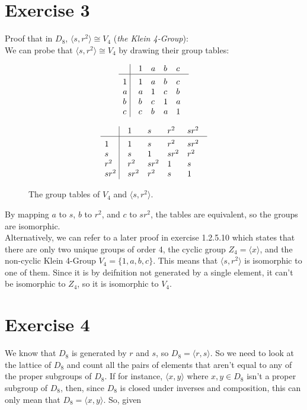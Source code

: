 \documentclass[12pt]{article}
\begin{document}
    \section*{Exercise 3}
    Proof that in $D_8$, $\langle s, r^2 \rangle \cong V_4$
    (\textit{the Klein 4-Group}): \\
    We can probe that $\langle s, r^2 \rangle \cong V_4$
    by drawing their group tables:

    \begin{figure}[H]
        \centering

        \[\vbox{\tabskip0.5em\offinterlineskip
        \halign{\strut$#$\hfil\ \tabskip1em\vrule&&$#$\hfil\cr
        ~   & 1   & a   & b & c \cr
        \noalign{\hrule}\vrule height 12pt width 0pt
        1   & 1 & a & b & c \cr 
        a   & a & 1 & c & b \cr 
        b   & b & c & 1 & a \cr 
        c   & c & b & a & 1 \cr
        }}\]

        
        \[\vbox{\tabskip0.5em\offinterlineskip
        \halign{\strut$#$\hfil\ \tabskip1em\vrule&&$#$\hfil\cr
        ~   & 1   & s   & r^2 & sr^2 \cr
        \noalign{\hrule}\vrule height 12pt width 0pt
        1   & 1 & s & r^2 & sr^2 \cr 
        s   & s & 1 & sr^2 & r^2 \cr 
        r^2   & r^2 & sr^2 & 1 & s \cr 
        sr^2   & sr^2 & r^2 & s & 1 \cr
        }}\]

        \caption{\label{fig:figure1} The group tables of $V_4$
        and $\langle s, r^2 \rangle$.}
    \end{figure}

    By mapping $a$ to $s$, $b$ to $r^2$, and $c$ to $sr^2$,
    the tables are equivalent,
    so the groups are isomorphic. \\ 
    Alternatively, we can refer to a later proof in exercise 1.2.5.10
    which states that there are only two unique groups of order 4,
    the cyclic group $Z_4 = \langle x \rangle$,
    and the non-cyclic Klein 4-Group $V_4 = \{1, a, b, c\}$.
    This means that $\langle s, r^2 \rangle$
    is isomorphic to one of them.
    Since it is by deifnition not generated by a single element,
    it can't be isomorphic to $Z_4$,
    so it is isomorphic to $V_4$.


    \section*{Exercise 4}
    We know that $D_8$ is generated by $r$ and $s$,
    so $D_8 = \langle r, s \rangle$.
    So we need to look at the lattice of $D_8$
    and count all the pairs of elements that aren't equal to 
    any of the proper subgroups of $D_8$.
    If for instance, $\langle x, y \rangle$ where $x, y \in D_8$
    isn't a proper subgroup of $D_8$,
    then, since $D_8$ is closed under inverses and composition,
    this can only mean that $D_8 = \langle x, y \rangle$.
    So, given
\end{document}
